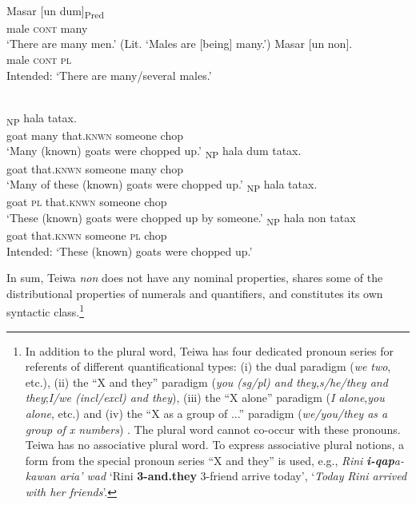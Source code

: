 \ea%
\label{ex:9:29}
 \\
\ea
\gll Masar [un dum]\textsubscript{Pred} \\
    male \textsc{cont} many \\
\glt  `There are many men.' (Lit. `Males are [being] many.')
\ex
\gll *Masar [un non]{.} \\
   male \textsc{cont} \textsc{pl}  \\
\glt  Intended: `There are many/several males.'
\z
\z







\ea%
\label{ex:9:30}
 \\
\ea
{}\textsubscript{NP} hala tatax. \\
   goat many that.\textsc{knwn} someone chop  \\
 \glt `Many (known) goats were chopped up.'
\ex
{}\textsubscript{NP} hala dum tatax. \\
   goat that.\textsc{knwn} someone many chop  \\
\glt `Many of these (known) goats were chopped up.'
\ex
{}\textsubscript{NP} hala tatax. \\
   goat \textsc{pl} that.\textsc{knwn} someone chop  \\
\glt  `These (known) goats were chopped up by someone.'
\ex
{}\textsubscript{NP} hala non tatax \\
   goat that.\textsc{knwn} someone \textsc{pl} chop  \\
\glt  Intended: `These (known) goats were chopped up.'
\z
\z


In sum, Teiwa \textit{non} does not have any nominal properties, shares some of the distributional properties of numerals and quantifiers, and constitutes its own syntactic class.\footnote{  In addition to the plural word, Teiwa has four dedicated pronoun series for referents of different quantificational types: (i) the dual paradigm (\textit{we} \textit{two}, etc.), (ii) the ``X and they'' paradigm (\textit{you (sg/pl) and they},\textit{s/he/they and they};\textit{I/we (incl/excl) and they}), (iii) the ``X alone'' paradigm (\textit{I} \textit{alone},\textit{you} \textit{alone}, etc.) and (iv) the ``X as a group of ...'' paradigm (\textit{we/you/they as a group of x numbers}) \citep[82-85]{Klamer2010}. The plural word cannot co-occur with these pronouns. Teiwa has no associative plural word. To express associative plural notions, a form from the special pronoun series ``X and they'' is used, e.g., \textit{Rini } \textbf{\textit{i-qap}}\textit{a-kawan aria' wad } `Rini \textbf{3-and.they} 3-friend
arrive today',  `\textit{Today} \textit{Rini arrived with her friends}'.}

